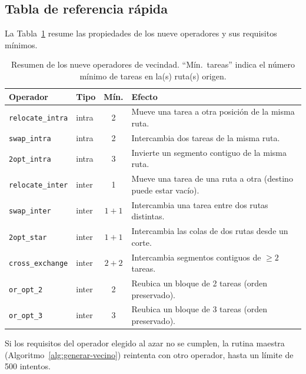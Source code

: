 \documentclass[11pt,a4paper]{article}
\theoremstyle{definition}
\theoremstyle{remark}
\begin{document}
\subsection{Tabla de referencia rápida}
\label{subsec:referencia-operadores}

La Tabla~\ref{tab:resumen-operadores} resume las propiedades de los nueve
operadores y sus requisitos mínimos.

\begin{table}[h]
\centering
\caption{Resumen de los nueve operadores de vecindad. ``Mín.\ tareas''
         indica el número mínimo de tareas en la(s) ruta(s) origen.}
\label{tab:resumen-operadores}
\small
\renewcommand{\arraystretch}{1.25}
\begin{tabular}{llcp{6.4cm}}
\toprule
Operador & Tipo & Mín. & Efecto \\
\midrule
\texttt{relocate\_intra} & intra & 2 & Mueve una tarea a otra posición de la misma ruta. \\
\texttt{swap\_intra}     & intra & 2 & Intercambia dos tareas de la misma ruta. \\
\texttt{2opt\_intra}     & intra & 3 & Invierte un segmento contiguo de la misma ruta. \\
\texttt{relocate\_inter} & inter & 1 & Mueve una tarea de una ruta a otra (destino puede estar vacío). \\
\texttt{swap\_inter}     & inter & $1{+}1$ & Intercambia una tarea entre dos rutas distintas. \\
\texttt{2opt\_star}      & inter & $1{+}1$ & Intercambia las colas de dos rutas desde un corte. \\
\texttt{cross\_exchange} & inter & $2{+}2$ & Intercambia segmentos contiguos de $\geq 2$ tareas. \\
\texttt{or\_opt\_2}      & inter & 2 & Reubica un bloque de 2 tareas (orden preservado). \\
\texttt{or\_opt\_3}      & inter & 3 & Reubica un bloque de 3 tareas (orden preservado). \\
\bottomrule
\end{tabular}
\end{table}

Si los requisitos del operador elegido al azar no se cumplen, la rutina
maestra (Algoritmo~\ref{alg:generar-vecino}) reintenta con otro operador,
hasta un límite de 500 intentos.

\end{document}
